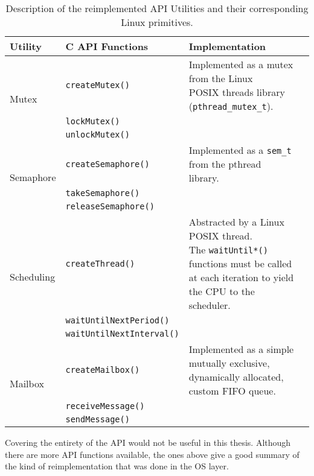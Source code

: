 {\begin{table}[htbp]
	\vspace{12pt}
	\centering
	\begin{tabularx}{\linewidth}{l l X}
		\toprule
		{\bfseries Utility} & \textbf{C API Functions} & \textbf{Implementation}\\
		\midrule
		\multirow{3}{*}{Mutex}  & \texttt{createMutex()}  & \multirowcell{3}[0pt][l]{Implemented as a mutex from the Linux\\ POSIX threads library (\texttt{pthread_mutex_t}).}\\								
		&\texttt{lockMutex()}&\\
		&\texttt{unlockMutex()}&\\
		\midrule
		\multirow{3}{*}{Semaphore}  & \texttt{createSemaphore()}  & \multirowcell{3}[0pt][l]{Implemented as a \texttt{sem_t} from the pthread\\ library.}\\								
		&\texttt{takeSemaphore()}&\\
		&\texttt{releaseSemaphore()}&\\
		\midrule
		\multirow{3}{*}{Scheduling} & \texttt{createThread()}  & \multirowcell{3}[0pt][l]{Abstracted by a Linux POSIX thread.\\ The \texttt{waitUntil*()} functions must be called\\ at each iteration to yield the CPU to the\\ scheduler.}\\
		&\texttt{waitUntilNextPeriod()}&\\
		&\texttt{waitUntilNextInterval()}&\\
		\midrule
		\multirow{3}{*}{Mailbox} & \texttt{createMailbox()}  & \multirowcell{3}[0pt][l]{Implemented as a simple mutually exclusive,\\ dynamically allocated, custom FIFO queue.}\\
		&\texttt{receiveMessage()}&\\
		&\texttt{sendMessage()}&\\
		\bottomrule
	\end{tabularx}
	\caption{Description of the reimplemented API Utilities and their corresponding Linux primitives.}
	\label{tab:does-api}
\end{table}
Covering the entirety of the API would not be useful in this thesis. Although there are more API functions available, the ones above give a good summary of the kind of reimplementation that was done in the OS layer.

}
